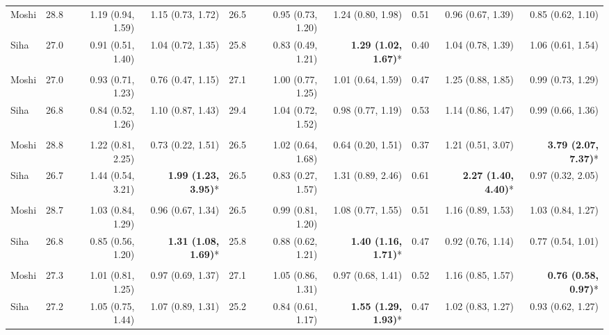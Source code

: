 \begin{table}[t]
\begin{tabular*}{\linewidth}{@{\extracolsep{\fill}}l|rrrrrrrrr}
\midrule\addlinespace[2.5pt]
\multicolumn{10}{l}{Poisoning} \\[2.5pt] 
\midrule\addlinespace[2.5pt]
Moshi & 28.8 & 1.19 (0.94, 1.59) & 1.15 (0.73, 1.72) & 26.5 & 0.95 (0.73, 1.20) & 1.24 (0.80, 1.98) & 0.51 & 0.96 (0.67, 1.39) & 0.85 (0.62, 1.10) \\ 
Siha & 27.0 & 0.91 (0.51, 1.40) & 1.04 (0.72, 1.35) & 25.8 & 0.83 (0.49, 1.21) & \textbf{1.29 (1.02, 1.67)}* & 0.40 & 1.04 (0.78, 1.39) & 1.06 (0.61, 1.54) \\ 
\midrule\addlinespace[2.5pt]
\multicolumn{10}{l}{Snake and Insect Bites} \\[2.5pt] 
\midrule\addlinespace[2.5pt]
Moshi & 27.0 & 0.93 (0.71, 1.23) & 0.76 (0.47, 1.15) & 27.1 & 1.00 (0.77, 1.25) & 1.01 (0.64, 1.59) & 0.47 & 1.25 (0.88, 1.85) & 0.99 (0.73, 1.29) \\ 
Siha & 26.8 & 0.84 (0.52, 1.26) & 1.10 (0.87, 1.43) & 29.4 & 1.04 (0.72, 1.52) & 0.98 (0.77, 1.19) & 0.53 & 1.14 (0.86, 1.47) & 0.99 (0.66, 1.36) \\ 
\midrule\addlinespace[2.5pt]
\multicolumn{10}{l}{Substance Abuse} \\[2.5pt] 
\midrule\addlinespace[2.5pt]
Moshi & 28.8 & 1.22 (0.81, 2.25) & 0.73 (0.22, 1.51) & 26.5 & 1.02 (0.64, 1.68) & 0.64 (0.20, 1.51) & 0.37 & 1.21 (0.51, 3.07) & \textbf{3.79 (2.07, 7.37)}* \\ 
Siha & 26.7 & 1.44 (0.54, 3.21) & \textbf{1.99 (1.23, 3.95)}* & 26.5 & 0.83 (0.27, 1.57) & 1.31 (0.89, 2.46) & 0.61 & \textbf{2.27 (1.40, 4.40)}* & 0.97 (0.32, 2.05) \\ 
\midrule\addlinespace[2.5pt]
\multicolumn{10}{l}{Fractures} \\[2.5pt] 
\midrule\addlinespace[2.5pt]
Moshi & 28.7 & 1.03 (0.84, 1.29) & 0.96 (0.67, 1.34) & 26.5 & 0.99 (0.81, 1.20) & 1.08 (0.77, 1.55) & 0.51 & 1.16 (0.89, 1.53) & 1.03 (0.84, 1.27) \\ 
Siha & 26.8 & 0.85 (0.56, 1.20) & \textbf{1.31 (1.08, 1.69)}* & 25.8 & 0.88 (0.62, 1.21) & \textbf{1.40 (1.16, 1.71)}* & 0.47 & 0.92 (0.76, 1.14) & 0.77 (0.54, 1.01) \\ 
\midrule\addlinespace[2.5pt]
\multicolumn{10}{l}{Road Traffic Accidents} \\[2.5pt] 
\midrule\addlinespace[2.5pt]
Moshi & 27.3 & 1.01 (0.81, 1.25) & 0.97 (0.69, 1.37) & 27.1 & 1.05 (0.86, 1.31) & 0.97 (0.68, 1.41) & 0.52 & 1.16 (0.85, 1.57) & \textbf{0.76 (0.58, 0.97)}* \\ 
Siha & 27.2 & 1.05 (0.75, 1.44) & 1.07 (0.89, 1.31) & 25.2 & 0.84 (0.61, 1.17) & \textbf{1.55 (1.29, 1.93)}* & 0.47 & 1.02 (0.83, 1.27) & 0.93 (0.62, 1.27) \\ 

\end{tabular*}
\end{table}
